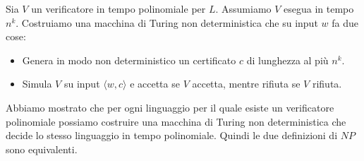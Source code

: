 Sia $V$ un verificatore in tempo polinomiale per $L$. Assumiamo $V$ esegua in
tempo $n^k$. Costruiamo una macchina di Turing non deterministica che su input $w$ fa due cose:
\begin{itemize}
    \item Genera in modo non deterministico un certificato $c$ di lunghezza al più $n^k$.
    \item Simula $V$ su input $\langle w, c \rangle$ e accetta se $V$ accetta,
          mentre rifiuta se $V$ rifiuta.
\end{itemize}
Abbiamo mostrato che per ogni linguaggio per il quale esiste un verificatore
polinomiale possiamo costruire una macchina di Turing non deterministica che decide
lo stesso linguaggio in tempo polinomiale. Quindi le due definizioni di $NP$ sono equivalenti.

